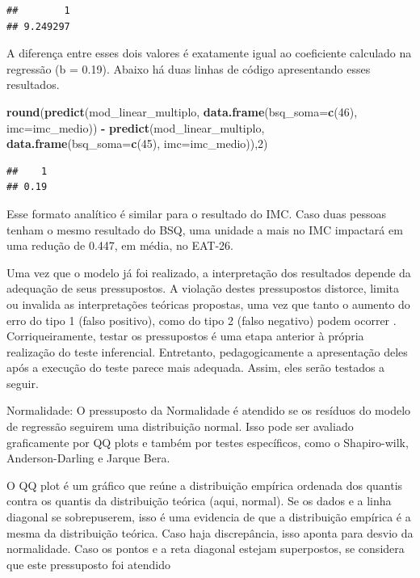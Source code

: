 \documentclass[
]{book}
\newenvironment{Shaded}{\begin{snugshade}}{\end{snugshade}}
\newcommand{\DataTypeTok}[1]{\textcolor[rgb]{0.13,0.29,0.53}{#1}}
\newcommand{\DecValTok}[1]{\textcolor[rgb]{0.00,0.00,0.81}{#1}}
\newcommand{\KeywordTok}[1]{\textcolor[rgb]{0.13,0.29,0.53}{\textbf{#1}}}
\newcommand{\NormalTok}[1]{#1}
\newcommand{\OperatorTok}[1]{\textcolor[rgb]{0.81,0.36,0.00}{\textbf{#1}}}
\newcommand{\StringTok}[1]{\textcolor[rgb]{0.31,0.60,0.02}{#1}}
\begin{document}
\begin{verbatim}
##        1 
## 9.249297
\end{verbatim}

A diferença entre esses dois valores é exatamente igual ao coeficiente calculado na regressão (b = 0.19). Abaixo há duas linhas de código apresentando esses resultados.

\begin{Shaded}
\begin{Highlighting}[]
\KeywordTok{round}\NormalTok{(}\KeywordTok{predict}\NormalTok{(mod_linear_multiplo, }\KeywordTok{data.frame}\NormalTok{(}\DataTypeTok{bsq_soma=}\KeywordTok{c}\NormalTok{(}\DecValTok{46}\NormalTok{), }\DataTypeTok{imc=}\NormalTok{imc_medio)) }\OperatorTok{-}\StringTok{ }\KeywordTok{predict}\NormalTok{(mod_linear_multiplo, }\KeywordTok{data.frame}\NormalTok{(}\DataTypeTok{bsq_soma=}\KeywordTok{c}\NormalTok{(}\DecValTok{45}\NormalTok{), }\DataTypeTok{imc=}\NormalTok{imc_medio)),}\DecValTok{2}\NormalTok{)}
\end{Highlighting}
\end{Shaded}

\begin{verbatim}
##    1 
## 0.19
\end{verbatim}

Esse formato analítico é similar para o resultado do IMC. Caso duas pessoas tenham o mesmo resultado do BSQ, uma unidade a mais no IMC impactará em uma redução de 0.447, em média, no EAT-26.

Uma vez que o modelo já foi realizado, a interpretação dos resultados depende da adequação de seus pressupostos. A violação destes pressupostos distorce, limita ou invalida as interpretações teóricas propostas, uma vez que tanto o aumento do erro do tipo 1 (falso positivo), como do tipo 2 (falso negativo) podem ocorrer \citep{Lix1996, Barker2015, Ernst2017}. Corriqueiramente, testar os pressupostos é uma etapa anterior à própria realização do teste inferencial. Entretanto, pedagogicamente a apresentação deles após a execução do teste parece mais adequada. Assim, eles serão testados a seguir.

Normalidade: O pressuposto da Normalidade é atendido se os resíduos do modelo de regressão seguirem uma distribuição normal. Isso pode ser avaliado graficamente por QQ plots e também por testes específicos, como o Shapiro-wilk, Anderson-Darling e Jarque Bera.

O QQ plot é um gráfico que reúne a distribuição empírica ordenada dos quantis contra os quantis da distribuição teórica (aqui, normal). Se os dados e a linha diagonal se sobrepuserem, isso é uma evidencia de que a distribuição empírica é a mesma da distribuição teórica. Caso haja discrepância, isso aponta para desvio da normalidade. Caso os pontos e a reta diagonal estejam superpostos, se considera que este pressuposto foi atendido
\end{document}
